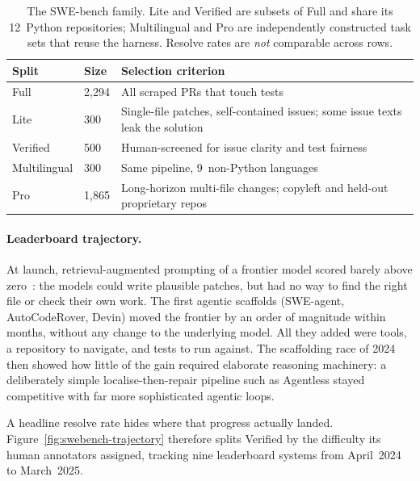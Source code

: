 \documentclass[
  english,        %
  font=times,     %
  twocolumn,      %
]{tumarticle}
\begin{document}
\begin{table}[t]
  \centering
  \caption{The SWE-bench family. Lite and Verified are subsets of Full and share
    its 12~Python repositories; Multilingual and Pro are independently
    constructed task sets that reuse the harness. Resolve rates are
    \emph{not} comparable across rows.}
  \label{tab:swebench-splits}
  \small
  \setlength{\tabcolsep}{4pt}
  \begin{tabular}{@{}llp{4.5cm}@{}}
    \toprule
    \textbf{Split} & \textbf{Size} & \textbf{Selection criterion} \\
    \midrule
    Full & 2{,}294 & All scraped PRs that touch tests \\
    Lite & 300 & Single-file patches, self-contained issues; some issue texts
      leak the solution~\cite{xia2024agentless} \\
    Verified & 500 & Human-screened for issue clarity and test
      fairness~\cite{openai2024verified} \\
    Multilingual & 300 & Same pipeline, 9~non-Python
      languages~\cite{swebench2025multilingual} \\
    Pro & 1{,}865 & Long-horizon multi-file changes; copyleft and held-out
      proprietary repos~\cite{deng2025swebenchpro} \\
    \bottomrule
  \end{tabular}
\end{table}


\paragraph{Leaderboard trajectory.}
At launch, retrieval-augmented prompting of a frontier model scored barely above
zero~\cite{jimenez2024swebench}: the models could write plausible patches, but had
no way to find the right file or check their own work. The first agentic scaffolds
(SWE-agent, AutoCodeRover, Devin) moved the frontier by an order of magnitude
within months, without any change to the underlying model. All they added were
tools, a repository to navigate, and tests to run against. The scaffolding race
of 2024 then showed how little of the gain required elaborate reasoning
machinery: a deliberately simple localise-then-repair pipeline such as Agentless
stayed competitive with far more sophisticated agentic loops.

A headline resolve rate hides where that progress actually landed.
Figure~\ref{fig:swebench-trajectory} therefore splits Verified by the difficulty
its human annotators assigned, tracking nine leaderboard systems from
April~2024 to March~2025.
\end{document}
